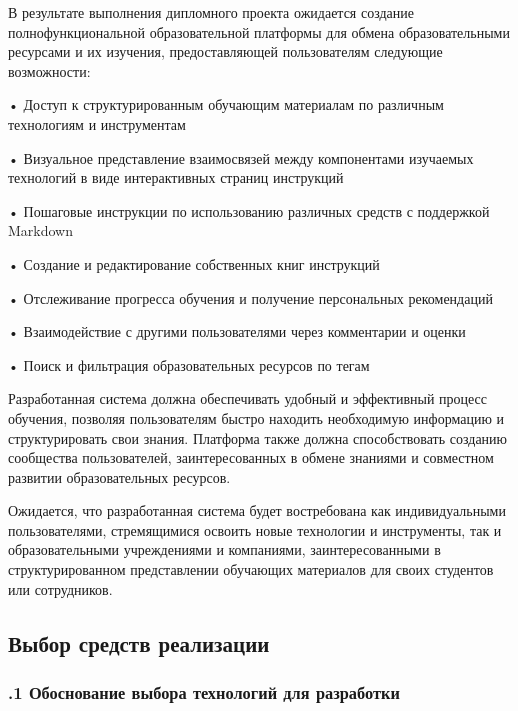 {\gostFont

  \par \redline В результате выполнения дипломного проекта ожидается создание полнофункциональной образовательной платформы для обмена образовательными ресурсами и их изучения, предоставляющей пользователям следующие возможности:

  \par \redline • Доступ к структурированным обучающим материалам по различным технологиям и инструментам
  \par \redline • Визуальное представление взаимосвязей между компонентами изучаемых технологий в виде интерактивных страниц инструкций
  \par \redline • Пошаговые инструкции по использованию различных средств с поддержкой Markdown
  \par \redline • Создание и редактирование собственных книг инструкций
  \par \redline • Отслеживание прогресса обучения и получение персональных рекомендаций
  \par \redline • Взаимодействие с другими пользователями через комментарии и оценки
  \par \redline • Поиск и фильтрация образовательных ресурсов по тегам

  \par \redline Разработанная система должна обеспечивать удобный и эффективный процесс обучения, позволяя пользователям быстро находить необходимую информацию и структурировать свои знания. Платформа также должна способствовать созданию сообщества пользователей, заинтересованных в обмене знаниями и совместном развитии образовательных ресурсов.

  \par \redline Ожидается, что разработанная система будет востребована как индивидуальными пользователями, стремящимися освоить новые технологии и инструменты, так и образовательными учреждениями и компаниями, заинтересованными в структурированном представлении обучающих материалов для своих студентов или сотрудников.

  \par
}

\subsection*{
  \gostTitleFont
   Выбор средств реализации
}

\titlespace

\subsubsection*{ 
  \gostTitleFont
  .1 Обоснование выбора технологий для разработки
} 

